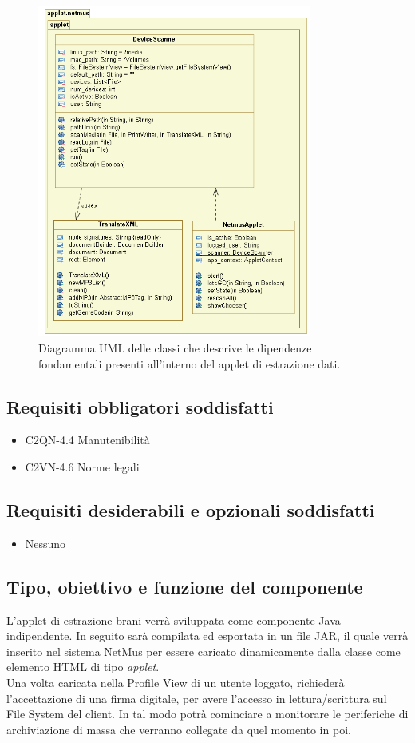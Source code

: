 \begin{figure}[!h]
  \centering
  \includegraphics[width=9cm]{img/DP/applet.png}
\caption{Diagramma UML delle classi che descrive le dipendenze
fondamentali presenti all'interno del applet di estrazione dati.}
\end{figure}

\subsection*{Requisiti obbligatori soddisfatti}
\begin{itemize}
	\item C2QN-4.4 Manutenibilit\`a
	\item C2VN-4.6 Norme legali
\end{itemize}
\subsection*{Requisiti desiderabili e opzionali soddisfatti}
\begin{itemize}
    \item Nessuno
\end{itemize}
\subsection*{Tipo, obiettivo e funzione del componente}
L'applet di estrazione brani verr\`a sviluppata come componente
Java indipendente. In seguito sar\`a compilata ed esportata in un file JAR, il
quale verr\`a inserito nel sistema NetMus per essere caricato dinamicamente
dalla classe  come elemento HTML di tipo \emph{applet}.\\
Una volta caricata nella Profile View di un utente loggato, richieder\`a
l'accettazione di una firma digitale, per avere l'accesso in lettura/scrittura
sul File System del client. In tal modo potr\`a cominciare a monitorare le
periferiche di archiviazione di massa che verranno collegate da quel momento in
poi.
